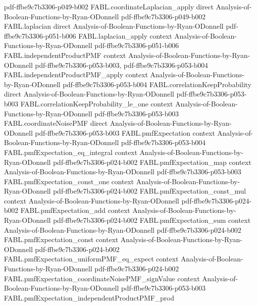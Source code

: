 \begin{theorem}
  {pdf-ffbe9c7b3306-p049-b002}
\proofstep
  {FABL.coordinateLaplacian_apply}
  {direct}
  {Analysis-of-Boolean-Functions-by-Ryan-ODonnell}
  {pdf-ffbe9c7b3306-p049-b002}
\proofstep
  {FABL.laplacian}
  {direct}
  {Analysis-of-Boolean-Functions-by-Ryan-ODonnell}
  {pdf-ffbe9c7b3306-p051-b006}
\proofstep
  {FABL.laplacian_apply}
  {context}
  {Analysis-of-Boolean-Functions-by-Ryan-ODonnell}
  {pdf-ffbe9c7b3306-p051-b006}
\proofstep
  {FABL.independentProductPMF}
  {context}
  {Analysis-of-Boolean-Functions-by-Ryan-ODonnell}
  {pdf-ffbe9c7b3306-p053-b003,
    pdf-ffbe9c7b3306-p053-b004}
\proofstep
  {FABL.independentProductPMF_apply}
  {context}
  {Analysis-of-Boolean-Functions-by-Ryan-ODonnell}
  {pdf-ffbe9c7b3306-p053-b004}
\proofstep
  {FABL.correlationKeepProbability}
  {direct}
  {Analysis-of-Boolean-Functions-by-Ryan-ODonnell}
  {pdf-ffbe9c7b3306-p053-b003}
\proofstep
  {FABL.correlationKeepProbability_le_one}
  {context}
  {Analysis-of-Boolean-Functions-by-Ryan-ODonnell}
  {pdf-ffbe9c7b3306-p053-b003}
\proofstep
  {FABL.coordinateNoisePMF}
  {direct}
  {Analysis-of-Boolean-Functions-by-Ryan-ODonnell}
  {pdf-ffbe9c7b3306-p053-b003}
\proofstep
  {FABL.pmfExpectation}
  {context}
  {Analysis-of-Boolean-Functions-by-Ryan-ODonnell}
  {pdf-ffbe9c7b3306-p053-b004}
\proofstep
  {FABL.pmfExpectation_eq_integral}
  {context}
  {Analysis-of-Boolean-Functions-by-Ryan-ODonnell}
  {pdf-ffbe9c7b3306-p024-b002}
\proofstep
  {FABL.pmfExpectation_map}
  {context}
  {Analysis-of-Boolean-Functions-by-Ryan-ODonnell}
  {pdf-ffbe9c7b3306-p053-b003}
\proofstep
  {FABL.pmfExpectation_const_one}
  {context}
  {Analysis-of-Boolean-Functions-by-Ryan-ODonnell}
  {pdf-ffbe9c7b3306-p024-b002}
\proofstep
  {FABL.pmfExpectation_const_mul}
  {context}
  {Analysis-of-Boolean-Functions-by-Ryan-ODonnell}
  {pdf-ffbe9c7b3306-p024-b002}
\proofstep
  {FABL.pmfExpectation_add}
  {context}
  {Analysis-of-Boolean-Functions-by-Ryan-ODonnell}
  {pdf-ffbe9c7b3306-p024-b002}
\proofstep
  {FABL.pmfExpectation_sum}
  {context}
  {Analysis-of-Boolean-Functions-by-Ryan-ODonnell}
  {pdf-ffbe9c7b3306-p024-b002}
\proofstep
  {FABL.pmfExpectation_const}
  {context}
  {Analysis-of-Boolean-Functions-by-Ryan-ODonnell}
  {pdf-ffbe9c7b3306-p024-b002}
\proofstep
  {FABL.pmfExpectation_uniformPMF_eq_expect}
  {context}
  {Analysis-of-Boolean-Functions-by-Ryan-ODonnell}
  {pdf-ffbe9c7b3306-p024-b002}
\proofstep
  {FABL.pmfExpectation_coordinateNoisePMF_signValue}
  {context}
  {Analysis-of-Boolean-Functions-by-Ryan-ODonnell}
  {pdf-ffbe9c7b3306-p053-b003}
\proofstep
  {FABL.pmfExpectation_independentProductPMF_prod}

\end{theorem}

